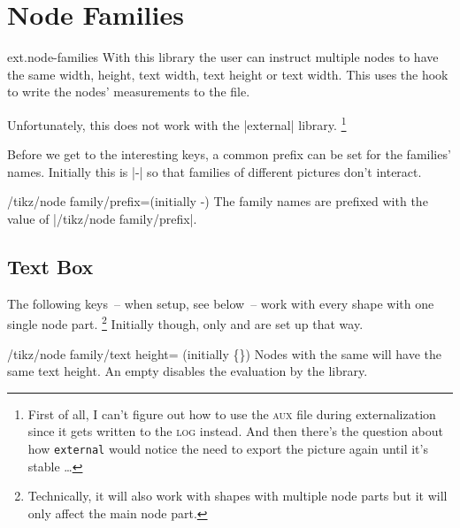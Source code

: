 %
%
%
\section{Node Families}
\begin{tikzlibrary}{ext.node-families}
  With this library the user can instruct multiple nodes to have the same
  width, height, text width, text height or text width.
  This uses the hook  to write the nodes'
  measurements to the  file.
  
  Unfortunately, this does not work with the |external| library.%
  \footnote{First of all, I can't figure out how to use the \textsc{aux} file during externalization since it gets written to the \textsc{log} instead.
            And then there's the question about how \texttt{external} would notice the need to export the picture again until it's stable \dots}


\end{tikzlibrary}

Before we get to the interesting keys, a common prefix can be set for the families' names.
Initially this is |\pgfpictureid-| so that families of different pictures don't interact.
\begin{key}{/tikz/node family/prefix=(initially \string\pgfpictureid-)}
The family names are prefixed with the value of |/tikz/node family/prefix|.
\end{key}

\subsection{Text Box}
\label{ssec:nf-text}
The following keys~-- when setup, see below~-- work with every shape with one single node part.%
\footnote{Technically, it will also work with shapes with multiple node parts but it will only affect the main node part.}
Initially though, only  and  are set up that way.
\begin{key}{/tikz/node family/text height= (initially \{\})}
Nodes with the same  will have the same text height.
An empty  disables the evaluation by the library.
\end{key}


